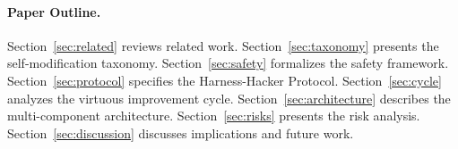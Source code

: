 \paragraph{Paper Outline.}
Section~\ref{sec:related} reviews related work.
Section~\ref{sec:taxonomy} presents the self-modification taxonomy.
Section~\ref{sec:safety} formalizes the safety framework.
Section~\ref{sec:protocol} specifies the Harness-Hacker Protocol.
Section~\ref{sec:cycle} analyzes the virtuous improvement cycle.
Section~\ref{sec:architecture} describes the multi-component architecture.
Section~\ref{sec:risks} presents the risk analysis.
Section~\ref{sec:discussion} discusses implications and future work.


